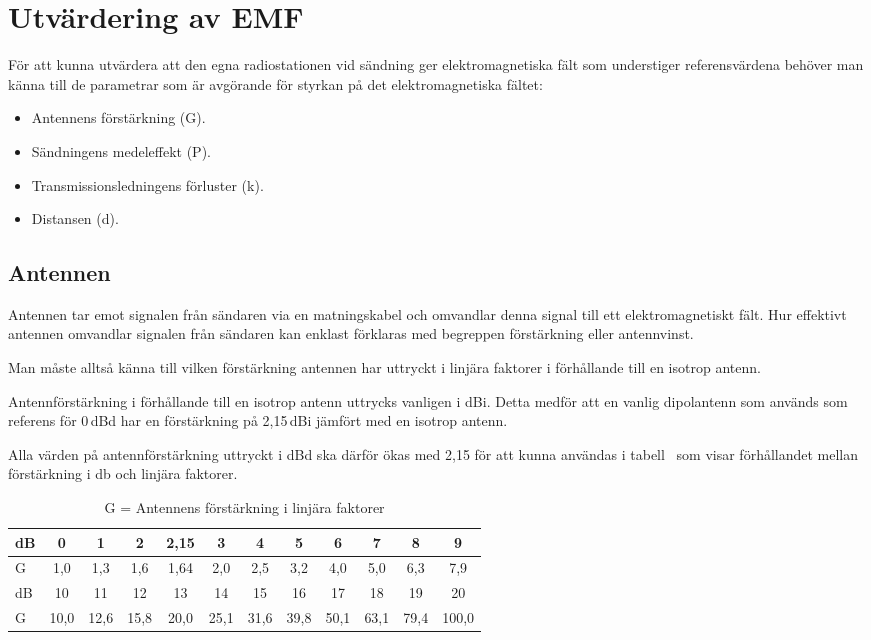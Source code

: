 \section{Utvärdering av EMF}

För att kunna utvärdera att den egna radiostationen vid sändning ger
elektromagnetiska fält som understiger referensvärdena behöver man känna till
de parametrar som är avgörande för styrkan på det elektromagnetiska fältet:

\begin{itemize}
  \item Antennens förstärkning (G).
  \item Sändningens medeleffekt (P).
  \item Transmissionsledningens förluster (k).
  \item Distansen (d).
\end{itemize}

\subsection{Antennen}
Antennen tar emot signalen från sändaren via en matningskabel och omvandlar
denna signal till ett elektromagnetiskt fält.
Hur effektivt antennen omvandlar signalen från sändaren kan enklast förklaras
med begreppen förstärkning eller antennvinst.

Man måste alltså känna till vilken förstärkning antennen har uttryckt i linjära
faktorer i förhållande till en isotrop antenn.

Antennförstärkning i förhållande till en isotrop antenn uttrycks vanligen i dBi.
Detta medför att en vanlig dipolantenn som används som referens för 0\,dBd har
en förstärkning på 2,15\,dBi jämfört med en isotrop antenn.

Alla värden på antennförstärkning uttryckt i dBd ska därför ökas med 2,15 för
att kunna användas i tabell~ som visar förhållandet mellan
förstärkning i \unit{\decibel} och linjära faktorer.

\begin{table*}[ht]
  \begin{center}
    \begin{tabular}{|l|ccccccccccc|}
    \hline
    dB     &  0  &  1  &  2 & 2,15 &  3  &  4  &  5  &  6  &  7  &  8  &  9  \\ \hline
    G & 1,0 & 1,3 & 1,6 & 1,64 & 2,0 & 2,5 & 3,2 & 4,0 & 5,0 & 6,3 & 7,9 \\ \hline\hline
    dB     &  10  &  11  &  12  &  13  &  14  &  15  &  16  &  17  &  18  &  19  &  20 \\ \hline
    G & 10,0 & 12,6 & 15,8 & 20,0 & 25,1 & 31,6 & 39,8 & 50,1 & 63,1 & 79,4 & 100,0 \\ \hline
    \end{tabular}
    \caption{G = Antennens förstärkning i linjära faktorer}
    \label{tab:forst}
  \end{center}
\end{table*}

